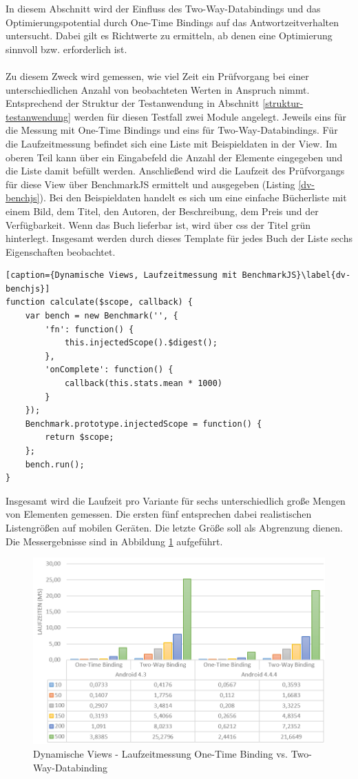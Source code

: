 In diesem Abschnitt wird der Einfluss des Two-Way-Databindings und das Optimierungspotential durch One-Time Bindings auf das Antwortzeitverhalten untersucht. Dabei gilt es Richtwerte zu ermitteln, ab denen eine Optimierung sinnvoll bzw. erforderlich ist. 
\\\\
Zu diesem Zweck wird gemessen, wie viel Zeit ein Prüfvorgang bei einer unterschiedlichen Anzahl von beobachteten Werten in Anspruch nimmt. Entsprechend der Struktur der Testanwendung in Abschnitt \ref{struktur-testanwendung} werden für diesen Testfall zwei Module angelegt. Jeweils eins für die Messung mit One-Time Bindings und eins für Two-Way-Databindings. Für die Laufzeitmessung befindet sich eine Liste mit Beispieldaten in der View. Im oberen Teil kann über ein Eingabefeld die Anzahl der Elemente eingegeben und die Liste damit befüllt werden. Anschließend wird die Laufzeit des Prüfvorgangs für diese View über BenchmarkJS ermittelt und ausgegeben (Listing \ref{dv-benchjs}). Bei den Beispieldaten handelt es sich um eine einfache Bücherliste mit einem Bild, dem Titel, den Autoren, der Beschreibung, dem Preis und der Verfügbarkeit. Wenn das Buch lieferbar ist, wird über \gls{css} der Titel grün hinterlegt. Insgesamt werden durch dieses Template für jedes Buch der Liste sechs Eigenschaften beobachtet. 
\begin{lstlisting}[caption={Dynamische Views, Laufzeitmessung mit BenchmarkJS}\label{dv-benchjs}]
function calculate($scope, callback) {
	var bench = new Benchmark('', {
		'fn': function() {
			this.injectedScope().$digest();
		},
		'onComplete': function() {
			callback(this.stats.mean * 1000)
		}
	});
	Benchmark.prototype.injectedScope = function() { 
		return $scope; 
	};
	bench.run();
}
\end{lstlisting}
Insgesamt wird die Laufzeit pro Variante für sechs unterschiedlich große Mengen von Elementen gemessen. Die ersten fünf entsprechen dabei realistischen Listengrößen auf mobilen Geräten. Die letzte Größe soll als Abgrenzung dienen. Die Messergebnisse sind in Abbildung \ref{dynamischeViews-measurement} aufgeführt. 
\begin{figure}[h]
	\centering
	\includegraphics[scale=0.6]{Bilder/Diagramme/DynamischeViews.png}
	\caption{Dynamische Views - Laufzeitmessung One-Time Binding vs. Two-Way-Databinding}
	\label{dynamischeViews-measurement}
\end{figure}
